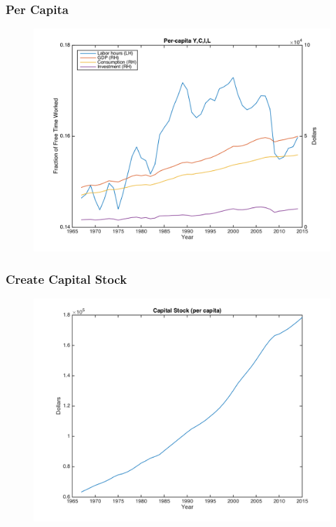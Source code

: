 \documentclass{beamer}
\begin{document}
\begin{frame}
\frametitle[alignment=center]{Per Capita}
\begin{figure}
\centering
\includegraphics[scale=0.5]{Figure_2.png}
\end{figure}
\end{frame}

\begin{frame}
\frametitle[alignment=center]{Create Capital Stock}
\begin{figure}
\centering
\includegraphics[scale=0.5]{Figure_3.png}
\end{figure}
\end{frame}
\end{document}
